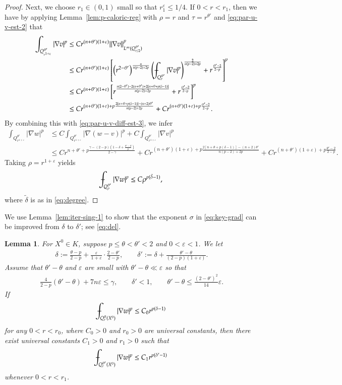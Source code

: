 \documentclass[11pt,oneside,english]{amsart}
\newcommand{\e}{\varepsilon}
\newcommand{\de}{\delta}
\newcommand{\D}{\nabla}
\numberwithin{equation}{section}
\def\Xint#1{\mathchoice
  {\XXint\displaystyle\textstyle{#1}}%
  {\XXint\textstyle\scriptstyle{#1}}%
  {\XXint\scriptstyle\scriptscriptstyle{#1}}%
  {\XXint\scriptscriptstyle\scriptscriptstyle{#1}}%
  \!\int}
\def\XXint#1#2#3{{\setbox0=\hbox{$#1{#2#3}{\int}$}
    \vcenter{\hbox{$#2#3$}}\kern-.5\wd0}}
\def\dashint{\Xint-}
\theoremstyle{plain}
\newtheorem{lemma}{Lemma}
\numberwithin{equation}{section}
\begin{document}
\begin{proof}
Next, we choose $r_1\in(0,1)$ small so that $r_1^\e\le 1/4$. If $0<r<r_1$, then we have by applying Lemma~\ref{lem:p-caloric-reg} with $\rho=r$ and $\tau=r^{\theta'}$ and \eqref{eq:par-u-v-est-2} that
\begin{align*}
    \int_{Q_{r^{1+\e}}^{\theta'}}|\D v|^p&\le Cr^{(n+\theta')(1+\e)}\|\D v\|_{L^\infty(Q_{r/2}^{\theta'})}^p\\
    &\le Cr^{(n+\theta')(1+\e)}\left[\left(r^{2-\theta'}\right)^{\frac{n}{n(p-2)+2p}}\left(\dashint_{Q_r^{\theta'}}|\D v|^p\right)^{\frac{2}{n(p-2)+2p}}+r^{\frac{\theta'-2}{2-p}}\right]^p\\
    &\le Cr^{(n+\theta')(1+\e)}\left[r^{\frac{n(2-\theta')-2(n+\theta')+2[n+\theta+p(\de-1)]}{n(p-2)+2p}}+r^{\frac{\theta'-2}{2-p}} \right]^p\\
    &\le Cr^{(n+\theta')(1+\e)+p\frac{2[n+\theta+p(\de-1)]-(n+2)\theta' }{n(p-2)+2p  }  }+Cr^{(n+\theta')(1+\e)+p\frac{\theta'-2}{2-p} }.
\end{align*}
By combining this with \eqref{eq:par-u-v-diff-est-3}, we infer
\begin{align*}
    \int_{Q_{r^{1+\e}}^{\theta'}}|\D w|^p&\le C\int_{Q^{\theta'}_{r^{1+\e}}}|\D(w-v)|^p+C\int_{Q^{\theta'}_{r^{1+\e}}}|\D v|^p\\
    &\le Cr^{n+\theta'+p\frac{\gamma-(2-p)(1-\delta+\frac{\theta'-\theta}{p}) }{2-\gamma} }+Cr^{(n+\theta')(1+\e)+p\frac{2[n+\theta+p(\de-1)]-(n+2)\theta'}{n(p-2)+2p}}+Cr^{(n+\theta')(1+\e)+p\frac{\theta'-2}{2-p} }.
\end{align*}
Taking $\rho=r^{1+\e}$ yields
$$
\dashint_{Q_{\rho}^{\theta'}}|\D w|^p\le C\rho^{p(\tilde\de-1)},
$$
where $\tilde\de$ is as in \eqref{eq:degree}.
\end{proof}

We use Lemma~\ref{lem:iter-sing-1} to show that the exponent $\sigma$ in \eqref{eq:key-grad} can be improved from $\de$ to $\de'$; see \eqref{eq:del}.

\begin{lemma}
    \label{lem:iter-sing-2}
    For $X^0\in K$, suppose $p\le\theta<\theta'<2$ and $0<\e<1$. We let
    \begin{align}\label{eq:del}
    \de:=\frac{\theta-p}{2-p}+\frac{\e}{1+\e}\cdot\frac{2-\theta'}{2-p},\qquad \de':=\de+\frac{\theta'-\theta}{(2-p)(1+\e)}.
    \end{align}
    Assume that $\theta'-\theta$ and $\e$ are small with $\theta'-\theta\ll \e$ so that
    \begin{align}
        \label{eq:iter-cond}
            \frac{4}{2-p}(\theta'-\theta)+7n\e\le \gamma,\qquad
            \de'<1,\qquad
            \theta'-\theta\le\frac{(2-\theta')^2}{14}\e.
    \end{align}
If 
$$
\dashint_{Q_r^\theta(X^0)}|\D w|^p\le C_0r^{p(\de-1)}
$$
for any $0<r<r_0$, where $C_0>0$ and $r_0>0$ are universal constants, then there exist universal constants $C_1>0$ and $r_1>0$ such that
$$
\dashint_{Q_r^{\theta'}(X^0)}|\D w|^p\le C_1r^{p(\de'-1)}
$$
whenever $0<r< r_1$.
\end{lemma}
\end{document}
